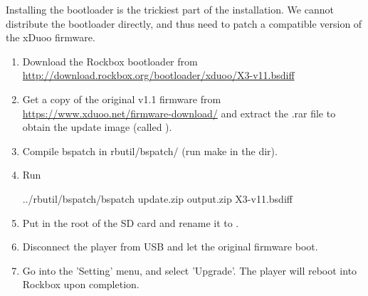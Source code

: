   Installing the bootloader is the trickiest part of the installation.
  We cannot distribute the bootloader directly, and thus need to patch a compatible
  version of the xDuoo firmware.

\begin{enumerate}

\item Download the Rockbox bootloader from
  \url{http://download.rockbox.org/bootloader/xduoo/X3-v11.bsdiff}

\item Get a copy of the original \playertype{} v1.1 firmware from
  \url{https://www.xduoo.net/firmware-download/} and extract the .rar file to obtain the
  update image (called ).

\item Compile bspatch in rbutil/bspatch/ (run make in the dir).

\item Run
\begin{code}
    ../rbutil/bspatch/bspatch update.zip output.zip X3-v11.bsdiff
\end{code}

\item Put  in the root of the SD card and rename it to .

\item Disconnect the player from USB and let the original firmware boot.

\item Go into the 'Setting' menu, and select 'Upgrade'. The player will reboot into Rockbox
  upon completion.

\end{enumerate}
